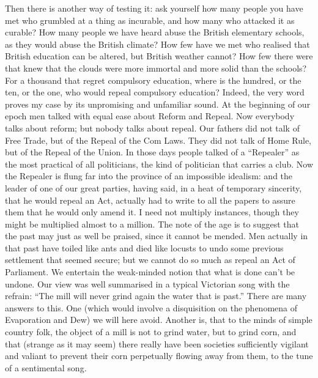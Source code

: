 \documentclass{book}
\begin{document}
Then there is another way of testing it: ask yourself how many people you have met who grumbled at a thing as incurable, and how many who attacked it as curable? How many people we have heard abuse the British elementary schools, as they would abuse the British climate? How few have we met who realised that British education can be altered, but British weather cannot? How few there were that knew that the clouds were more immortal and more solid than the schools? For a thousand that regret compulsory education, where is the hundred, or the ten, or the one, who would repeal compulsory education? Indeed, the very word proves my case by its unpromising and unfamiliar sound. At the beginning of our epoch men talked with equal ease about Reform and Repeal. Now everybody talks about reform; but nobody talks about repeal. Our fathers did not talk of Free Trade, but of the Repeal of the Com Laws. They did not talk of Home Rule, but of the Repeal of the Union. In those days people talked of a “Repealer” as the most practical of all politicians, the kind of politician that carries a club. Now the Repealer is flung far into the province of an impossible idealism: and the leader of one of our great parties, having said, in a heat of temporary sincerity, that he would repeal an Act, actually had to write to all the papers to assure them that he would only amend it. I need not multiply instances, though they might be multiplied almost to a million. The note of the age is to suggest that the past may just as well be praised, since it cannot be mended. Men actually in that past have toiled like ants and died like locusts to undo some previous settlement that seemed secure; but we cannot do so much as repeal an Act of Parliament. We entertain the weak-minded notion that what is done can’t be undone. Our view was well summarised in a typical Victorian song with the refrain: “The mill will never grind again the water that is past.” There are many answers to this. One (which would involve a disquisition on the phenomena of Evaporation and Dew) we will here avoid. Another is, that to the minds of simple country folk, the object of a mill is not to grind water, but to grind corn, and that (strange as it may seem) there really have been societies sufficiently vigilant and valiant to prevent their corn perpetually flowing away from them, to the tune of a sentimental song.
\end{document}
